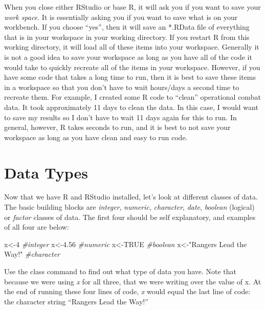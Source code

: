 \documentclass[]{book}
\newenvironment{Shaded}{\begin{snugshade}}{\end{snugshade}}
\newcommand{\DecValTok}[1]{\textcolor[rgb]{0.00,0.00,0.81}{{#1}}}
\newcommand{\FloatTok}[1]{\textcolor[rgb]{0.00,0.00,0.81}{{#1}}}
\newcommand{\StringTok}[1]{\textcolor[rgb]{0.31,0.60,0.02}{{#1}}}
\newcommand{\CommentTok}[1]{\textcolor[rgb]{0.56,0.35,0.01}{\textit{{#1}}}}
\newcommand{\OtherTok}[1]{\textcolor[rgb]{0.56,0.35,0.01}{{#1}}}
\newcommand{\NormalTok}[1]{{#1}}
\begin{document}
When you close either RStudio or base R, it will ask you if you want to
save your \emph{work space}. It is essentially asking you if you want to
save what is on your workbench. If you choose ``yes'', then it will save
an *.RData file of everything that is in your workspace in your working
directory. If you restart R from this working directory, it will load
all of these items into your workspace. Generally it is not a good idea
to save your workspace as long as you have all of the code it would take
to quickly recreate all of the items in your workspace. However, if you
have some code that takes a long time to run, then it is best to save
these items in a workspace so that you don't have to wait hours/days a
second time to recreate them. For example, I created some R code to
``clean'' operational combat data. It took approximately 11 days to
clean the data. In this case, I would want to save my results so I don't
have to wait 11 days again for this to run. In general, however, R takes
seconds to run, and it is best to not save your workspace as long as you
have clean and easy to run code.

\section{Data Types}\label{data-types}

Now that we have R and RStudio installed, let's look at different
classes of data. The basic building blocks are \emph{integer},
\emph{numeric}, \emph{character}, \emph{date}, \emph{boolean} (logical)
or \emph{factor} classes of data. The first four should be self
explanatory, and examples of all four are below:

\begin{Shaded}
\begin{Highlighting}[]
\NormalTok{x<-}\DecValTok{4}                   \CommentTok{#integer}
\NormalTok{x<-}\FloatTok{4.56}                \CommentTok{#numeric}
\NormalTok{x<-}\OtherTok{TRUE}                \CommentTok{#boolean}
\NormalTok{x<-}\StringTok{"Rangers Lead the Way!"}  \CommentTok{#character}
\end{Highlighting}
\end{Shaded}

Use the class command to find out what type of data you have. Note that
because we were using \emph{x} for all three, that we were writing over
the value of x. At the end of running these four lines of code, \emph{x}
would equal the last line of code: the character string ``Rangers Lead
the Way!''
\end{document}
